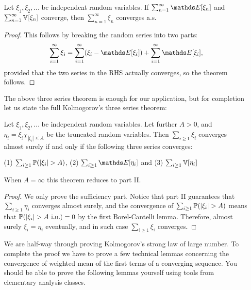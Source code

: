\begin{theorem}
Let $\xi_1, \xi_2, \dots$ be independent random variables. If $\sum_{n=1}^\infty \E[\xi_n]$ and $\sum_{n=1}^\infty \mathbb{V}[\xi_n]$ converge, then $\sum_{n=1}^\infty \xi_n$ converges a.s.
\end{theorem}

\begin{proof}
This follows by breaking the random series into two parts:
\begin{equation}
\sum_{i=1}^\infty \xi_i = \sum_{i=1}^\infty (\xi_i - \E[\xi_i]) + \sum_{i=1}^\infty \E[\xi_i],
\end{equation}
provided that the two series in the RHS actually converges, so the theorem follows.
\end{proof}

\begin{unexaminable}
The above three series theorem is enough for our application, but for completion let us state the full Kolmogorov's three series theorem:
\begin{corollary} 
Let $\xi_1, \xi_2, ...$ be independent random variables. Let further $A>0$, and $\eta_i = \xi_i \chi_{|\xi_i| \leq A}$ be the truncated random variables. Then $\sum_{i\geq 1} \xi_i$ converges almost surely if and only if the following three series converges:
\begin{center}
(1) $\sum_{i\geq 1} \mathbb{P}(|\xi_i| > A)$, (2) $\sum_{i\geq 1} \E[\eta_i]$ and (3) $\sum_{i\geq 1} \mathbb{V}[\eta_i]$
\end{center}
When $A = \infty$ this theorem reduces to part II.
\end{corollary}

\begin{proof}
We only prove the sufficiency part. Notice that part II guarantees that $\sum_{i\geq 1} \eta_i$ converges almost surely, and the convergence of $\sum_{i\geq 1} \mathbb{P}(|\xi_i| > A)$ means that $\mathbb{P}(|\xi_i| > A \text{ i.o.}) = 0$ by the first Borel-Cantelli lemma. Therefore, almost surely $\xi_i = \eta_i$ eventually, and in such case $\sum_{i\geq 1} \xi_i$ converges.
\end{proof}
\end{unexaminable}

We are half-way through proving Kolmogorov's strong law of large number. To complete the proof we have to prove a few technical lemmas concerning the convergence of weighted mean of the first terms of a converging sequence. You should be able to prove the following lemmas yourself using tools from elementary analysis classes.

